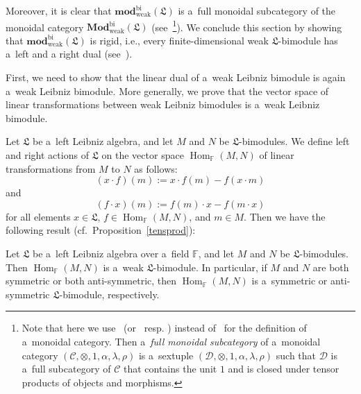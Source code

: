 \documentclass{jonasart}
\DeclareMathOperator{\bi}{bi}
\DeclareMathOperator{\Hom}{Hom}
\DeclareMathOperator{\weak}{weak}
\newcommand{\ccal}{\mathcal{C}}
\newcommand{\dcal}{\mathcal{D}}
\newcommand{\fbb}{\mathbb{F}}
\newcommand{\fdmod}{\mathbf{mod}}
\newcommand{\lf}{\mathfrak{L}}
\newcommand{\Mod}{\mathbf{Mod}}
\begin{document}
	Moreover, it is clear that $\fdmod_{\weak}^{\bi}(\lf)$ is a~full monoidal subcategory of the monoidal category $\Mod_{\weak}^{\bi}(\lf)$ (see~\cite[Definition 2.1.4]{EGNO}\footnote{Note that here we use~\cite[Definition 2.2.8]{EGNO} (or~\cite[pp.~162/163]{McL} resp. \cite[Definition XI.2.1]{K}) instead of~\cite[Definition 2.1.1]{EGNO} for the definition of a~monoidal category. Then a~\emph{full monoidal subcategory} of a~monoidal category $(\ccal, \otimes, 1,\alpha, \lambda, \rho)$ is a~sextuple $(\dcal, \otimes, 1, \alpha, \lambda, \rho)$ such that $\dcal$ is a~full subcategory of $\ccal$ that contains the unit $1$ and is closed under tensor products of objects and morphisms.}). We conclude this section by showing that $\fdmod_{\weak}^{\bi}(\lf)$ is rigid, i.e., every finite-dimensional weak $\lf$-bimodule has a~left and a right dual (see~\cite[Definitions 2.10.1, 2.10.2, and 2.10.11]{EGNO}).

	First, we need to show that the linear dual of a~weak Leibniz bimodule is again a~weak Leibniz bimodule. More generally, we prove that the vector space of linear transformations between weak Leibniz bimodules is a~weak Leibniz bimodule.

	Let $\lf$ be a~left Leibniz algebra, and let $M$ and $N$ be $\lf$-bimodules. We define left and right actions of $\lf$ on the vector space $\Hom_\fbb
	(M,N)$ of linear transformations from $M$ to $N$ as follows:
	\[
		(x\cdot f)(m):=x\cdot f(m)-f(x\cdot m)
	\]
	and
	\[
		(f\cdot x)(m):=f(m)\cdot x-f(m\cdot x)
	\]
	for all elements $x\in\lf$, $f\in\Hom_\fbb(M,N)$, and $m\in M$. Then we have the following result (cf.\ Proposition~\ref{tensprod}):
	\begin{proposition}\label{hom}
		Let $\lf$ be a~left Leibniz algebra over a~field $\fbb$, and let $M$ and
		$N$ be $\lf$-bimodules. Then $\Hom_\fbb(M,N)$ is a~weak $\lf$-bimodule. In particular, if $M$ and $N$ are both symmetric or both anti-symmetric, then $\Hom_\fbb(M,N)$ is a~symmetric or anti-symmetric
		$\lf$-bimodule, respectively.
	\end{proposition}
\end{document}
